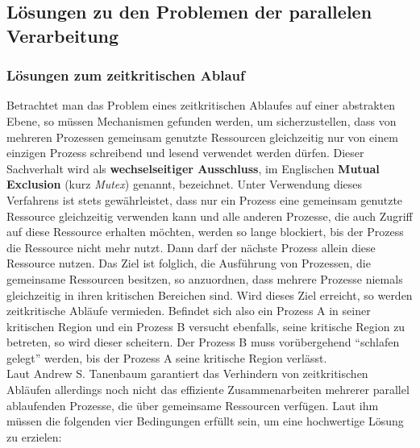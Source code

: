 		\subsection{Lösungen zu den Problemen der parallelen Verarbeitung}
		
			\subsubsection{Lösungen zum zeitkritischen Ablauf}
			
				Betrachtet man das Problem eines zeitkritischen Ablaufes auf einer abstrakten Ebene, so müssen Mechanismen gefunden werden, um sicherzustellen, dass von mehreren Prozessen gemeinsam genutzte Ressourcen gleichzeitig nur von einem einzigen Prozess schreibend und lesend verwendet werden dürfen. Dieser Sachverhalt wird als \textbf{wechselseitiger Ausschluss}, im Englischen \textbf{Mutual Exclusion} (kurz \textit{Mutex}) genannt, bezeichnet. Unter Verwendung dieses Verfahrens ist stets gewährleistet, dass nur ein Prozess eine gemeinsam genutzte Ressource gleichzeitig verwenden kann und alle anderen Prozesse, die auch Zugriff auf diese Ressource erhalten möchten, werden so lange blockiert, bis der Prozess die Ressource nicht mehr nutzt. Dann darf der nächste Prozess allein diese Ressource nutzen. Das Ziel ist folglich, die Ausführung von Prozessen, die gemeinsame Ressourcen besitzen, so anzuordnen, dass mehrere Prozesse niemals gleichzeitig in ihren kritischen Bereichen sind. Wird dieses Ziel erreicht, so werden zeitkritische Abläufe vermieden. Befindet sich also ein Prozess A in seiner kritischen Region und ein Prozess B versucht ebenfalls, seine kritische Region zu betreten, so wird dieser scheitern. Der Prozess B muss vorübergehend "`schlafen gelegt"' werden, bis der Prozess A seine kritische Region verlässt.\\
				Laut Andrew S. Tanenbaum garantiert das Verhindern von zeitkritischen Abläufen allerdings noch nicht das effiziente Zusammenarbeiten mehrerer parallel ablaufenden Prozesse, die über gemeinsame Ressourcen verfügen. Laut ihm müssen die folgenden vier Bedingungen erfüllt sein, um eine hochwertige Lösung zu erzielen:\\
				
